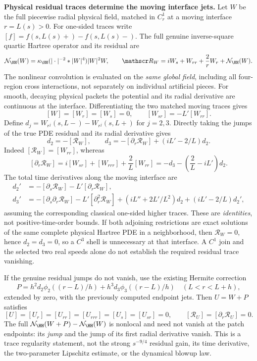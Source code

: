 \medskip
\noindent\textbf{Physical residual traces determine the moving interface jets.}
Let \(W\) be the full piecewise radial physical field, matched in \(C^1_r\)
at a moving interface \(r=L(s)>0\). For one-sided traces write
\([f]=f(s,L(s)+)-f(s,L(s)-)\). The full genuine inverse-square quartic
Hartree operator and its residual are
\[
 \mathcal N_{\HH}(W)=\kappa_{\HH}
   (|\cdot|^{-2}*|W|^4)|W|^2W,\qquad
 \mathscr R_W=iW_s+W_{rr}+\frac2rW_r+\mathcal N_{\HH}(W).
\]
The nonlinear convolution is evaluated on the \emph{same global field},
including all four-region cross interactions, not separately on
individual artificial pieces. For smooth, decaying physical packets the
potential and its radial derivative are continuous at the interface.
Differentiating the two matched moving traces gives
\[
 [W]=[W_r]=[W_s]=0,\qquad [W_{sr}]=-L'[W_{rr}].
\]
Define \(d_j=W_{r^j}(s,L-)-W_{r^j}(s,L+)\) for \(j=2,3\). Directly taking
the jumps of the true PDE residual and its radial derivative gives
\begin{equation}
 \boxed{\,d_2=-[\mathscr R_W],\qquad
 d_3=-[\partial_r\mathscr R_W]+(iL'-2/L)d_2.\,}
 \label{eq:hbl-selected-physical-interface-jets}
\end{equation}
Indeed \([\mathscr R_W]=[W_{rr}]\), whereas
\[
 [\partial_r\mathscr R_W]
   =i[W_{sr}]+[W_{rrr}]+\frac2L[W_{rr}]
   =-d_3-\left(\frac2L-iL'\right)d_2.
\]
The total time derivatives along the moving interface are
\begin{align*}
 d_2'&=-[\partial_s\mathscr R_W]-L'[\partial_r\mathscr R_W],\\
 d_3'&=-[\partial_s\partial_r\mathscr R_W]
       -L'[\partial_r^2\mathscr R_W]
       +(iL''+2L'/L^2)d_2+(iL'-2/L)d_2',
\end{align*}
assuming the corresponding classical one-sided higher traces.
These are \emph{identities}, not positive-time-order bounds.
If both adjoining restrictions are exact solutions of the same
complete physical Hartree PDE in a neighborhood, then
\(\mathscr R_W=0\), hence \(d_2=d_3=0\), so a \(C^3\) shell is unnecessary
at that interface. A \(C^1\) join and the selected two real speeds
alone do not establish the required residual trace vanishing.

If the genuine residual jumps do not vanish, use the existing Hermite
correction
\[
 P=h^2d_2\phi_2((r-L)/h)+h^3d_3\phi_3((r-L)/h)
 \quad (L<r<L+h),
\]
extended by zero, with the previously computed endpoint jets.
Then \(U=W+P\) satisfies
\[
 [U]=[U_r]=[U_{rr}]=[U_{rrr}]=[U_s]=[U_{sr}]=0,
 \qquad
 \boxed{[\mathscr R_U]=[\partial_r\mathscr R_U]=0.}
\]
The full \(\mathcal N_{\HH}(W+P)-\mathcal N_{\HH}(W)\) is nonlocal and
need not vanish at the patch endpoints: its \emph{jump} and the jump of
its first radial derivative vanish. This is a trace regularity
statement, not the strong \(s^{-9/4}\) residual gain, its time
derivative, the two-parameter Lipschitz estimate, or the dynamical
blowup law.


